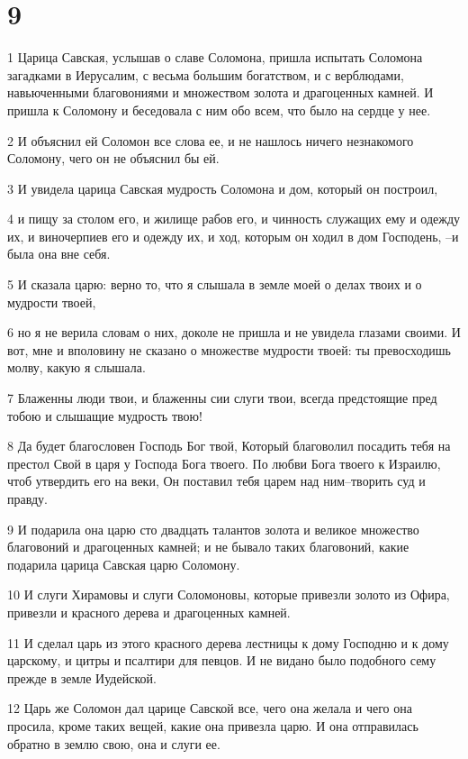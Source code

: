 \chapter{9}

\par 1 Царица Савская, услышав о славе Соломона, пришла испытать Соломона загадками в Иерусалим, с весьма большим богатством, и с верблюдами, навьюченными благовониями и множеством золота и драгоценных камней. И пришла к Соломону и беседовала с ним обо всем, что было на сердце у нее.
\par 2 И объяснил ей Соломон все слова ее, и не нашлось ничего незнакомого Соломону, чего он не объяснил бы ей.
\par 3 И увидела царица Савская мудрость Соломона и дом, который он построил,
\par 4 и пищу за столом его, и жилище рабов его, и чинность служащих ему и одежду их, и виночерпиев его и одежду их, и ход, которым он ходил в дом Господень, --и была она вне себя.
\par 5 И сказала царю: верно то, что я слышала в земле моей о делах твоих и о мудрости твоей,
\par 6 но я не верила словам о них, доколе не пришла и не увидела глазами своими. И вот, мне и вполовину не сказано о множестве мудрости твоей: ты превосходишь молву, какую я слышала.
\par 7 Блаженны люди твои, и блаженны сии слуги твои, всегда предстоящие пред тобою и слышащие мудрость твою!
\par 8 Да будет благословен Господь Бог твой, Который благоволил посадить тебя на престол Свой в царя у Господа Бога твоего. По любви Бога твоего к Израилю, чтоб утвердить его на веки, Он поставил тебя царем над ним--творить суд и правду.
\par 9 И подарила она царю сто двадцать талантов золота и великое множество благовоний и драгоценных камней; и не бывало таких благовоний, какие подарила царица Савская царю Соломону.
\par 10 И слуги Хирамовы и слуги Соломоновы, которые привезли золото из Офира, привезли и красного дерева и драгоценных камней.
\par 11 И сделал царь из этого красного дерева лестницы к дому Господню и к дому царскому, и цитры и псалтири для певцов. И не видано было подобного сему прежде в земле Иудейской.
\par 12 Царь же Соломон дал царице Савской все, чего она желала и чего она просила, кроме таких вещей, какие она привезла царю. И она отправилась обратно в землю свою, она и слуги ее.
